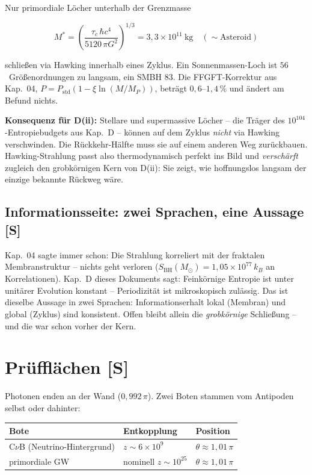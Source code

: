 Nur primordiale Löcher unterhalb der Grenzmasse

\[
  M^{*} = \left(\frac{\tau_c\,\hbar c^4}{5120\,\pi G^2}\right)^{1/3}
  = 3{,}3\times10^{11}~\text{kg} \quad(\sim\text{Asteroid})
\]

schließen via Hawking innerhalb eines Zyklus. Ein
Sonnenmassen-Loch ist $56$~Größenordnungen zu langsam, ein SMBH
$83$. Die FFGFT-Korrektur aus Kap.~04,
$P = P_\text{std}(1 - \xi\ln(M/M_P))$, beträgt $0{,}6$--$1{,}4\,\%$
und ändert am Befund nichts.

\textbf{Konsequenz für D(ii):} Stellare und supermassive Löcher
-- die Träger des $10^{104}$-Entropiebudgets aus Kap.~D -- können
auf dem Zyklus \emph{nicht} via Hawking verschwinden. Die
Rückkehr-Hälfte muss sie auf einem anderen Weg zurückbauen.
Hawking-Strahlung passt also thermodynamisch perfekt ins Bild und
\emph{verschärft} zugleich den grobkörnigen Kern von D(ii): Sie
zeigt, wie hoffnungslos langsam der einzige bekannte Rückweg wäre.

\section{Informationsseite: zwei Sprachen, eine Aussage [S]}

Kap.~04 sagte immer schon: Die Strahlung korreliert mit der
fraktalen Membranstruktur -- nichts geht verloren
($S_\text{BH}(M_\odot) = 1{,}05\times10^{77}\,k_B$ an
Korrelationen). Kap.~D dieses Dokuments sagt: Feinkörnige Entropie
ist unter unitärer Evolution konstant -- Periodizität ist
mikroskopisch zulässig. Das ist dieselbe Aussage in zwei Sprachen:
Informationserhalt lokal (Membran) und global (Zyklus) sind
konsistent. Offen bleibt allein die \emph{grobkörnige}
Schließung -- und die war schon vorher der Kern.

\chapter{Prüfflächen [S]}

Photonen enden an der Wand ($0{,}992\,\pi$). Zwei Boten stammen
vom Antipoden selbst oder dahinter:

\begin{center}
\begin{tabular}{lll}
\toprule
Bote & Entkopplung & Position \\
\midrule
C$\nu$B (Neutrino-Hintergrund) & $z \sim 6\times10^{9}$ &
  $\theta \approx 1{,}01\,\pi$ \\
primordiale GW & nominell $z \sim 10^{25}$ &
  $\theta \approx 1{,}01\,\pi$ \\
\bottomrule
\end{tabular}
\end{center}

